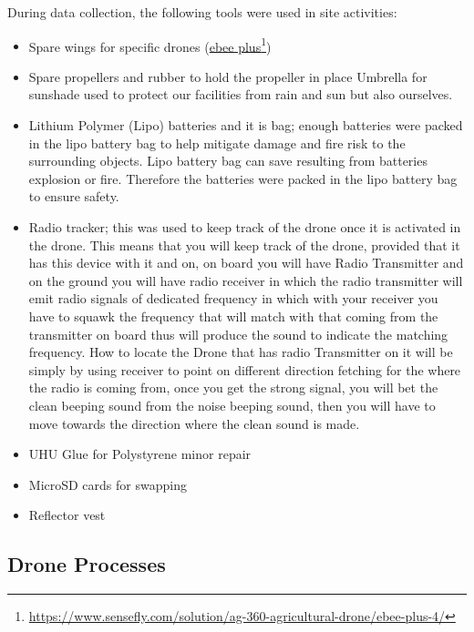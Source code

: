 \documentclass[a4paper,12pt,twoside]{article}
\begin{document}
    During data collection, the following tools were used in site activities:
    \begin{itemize}
  
        \item Spare wings for specific drones (\href{https://www.sensefly.com/solution/ag-360-agricultural-drone/ebee-plus-4/}{ebee plus}\footnote{\url{https://www.sensefly.com/solution/ag-360-agricultural-drone/ebee-plus-4/}})
        \item Spare propellers and rubber to hold the propeller in place
        Umbrella for sunshade used to protect our facilities from rain and sun but also ourselves.
        \item Lithium Polymer (Lipo) batteries and it is bag; enough batteries were packed in the lipo battery bag to help mitigate damage and fire risk to the surrounding objects. Lipo battery bag can save resulting from batteries explosion or fire. Therefore the batteries were packed in the lipo battery bag to ensure safety. 
        \item Radio tracker; this was used to keep track of the drone once it is activated in the drone. This means that you will keep track of the drone, provided that it has this device with it and on, on board you will have Radio Transmitter and on the ground you will have radio receiver in which the radio transmitter will emit radio signals of dedicated frequency in which with your receiver you have to squawk the frequency that will match with that coming from the transmitter on board thus will produce the sound to indicate the matching frequency. How to locate the Drone that has radio Transmitter on it will be simply by using receiver to point on different direction fetching for the where the radio is coming from, once you get the strong signal, you will bet the clean beeping sound from the noise beeping sound, then you will have to move towards the direction where the clean sound is made.
        \item UHU Glue for Polystyrene minor repair
        \item MicroSD cards for swapping
        \item Reflector vest
    
    \end{itemize}

\subsection{Drone Processes}
\end{document}
